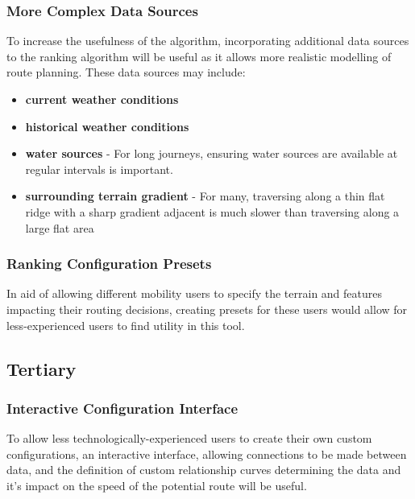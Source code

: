 \hypertarget{more-complex-data-sources}{%
\subsubsection{More Complex Data
Sources}\label{more-complex-data-sources}}

To increase the usefulness of the algorithm, incorporating additional
data sources to the ranking algorithm will be useful as it allows more
realistic modelling of route planning. These data sources may include:

\begin{itemize}
\tightlist
\item
  \textbf{current weather conditions}
\item
  \textbf{historical weather conditions}
\item
  \textbf{water sources} - For long journeys, ensuring water sources are
  available at regular intervals is important.
\item
  \textbf{surrounding terrain gradient} - For many, traversing along a
  thin flat ridge with a sharp gradient adjacent is much slower than
  traversing along a large flat area
\end{itemize}

\hypertarget{ranking-configuration-presets}{%
\subsubsection{Ranking Configuration
Presets}\label{ranking-configuration-presets}}

In aid of allowing different mobility users to specify the terrain and
features impacting their routing decisions, creating presets for these
users would allow for less-experienced users to find utility in this
tool.

\hypertarget{tertiary}{%
\subsection{Tertiary}\label{tertiary}}

\hypertarget{interactive-configuration-interface}{%
\subsubsection{Interactive Configuration
Interface}\label{interactive-configuration-interface}}

To allow less technologically-experienced users to create their own
custom configurations, an interactive interface, allowing connections to
be made between data, and the definition of custom relationship curves
determining the data and it's impact on the speed of the potential route
will be useful.

